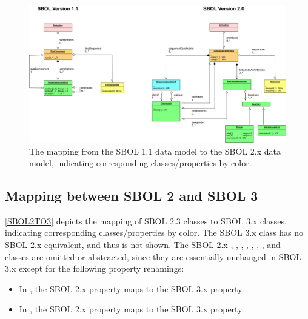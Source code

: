 \begin{figure}[htp]
\begin{center}
  \includegraphics[width=\textwidth]{images/sbol_v1_to_v2}
\end{center}
\caption{\label{SBOL1TO2}The mapping from the SBOL 1.1 data model to the SBOL 2.x  data model, indicating corresponding classes/properties by color.}
\end{figure}



\subsection{Mapping between SBOL 2 and SBOL 3}

\ref{SBOL2TO3} depicts the mapping of SBOL 2.3 classes to SBOL 3.x classes, indicating corresponding classes/properties by color.   
The SBOL 3.x  class has no SBOL 2.x equivalent, and thus is not shown.
The SBOL 2.x , , , , , , , and \\  classes are omitted or abstracted, since they are essentially unchanged in SBOL 3.x except for the following property renamings:
\begin{itemize}
\item In , the SBOL 2.x  property maps to the SBOL 3.x  property.
\item In , the SBOL 2.x  property maps to the SBOL 3.x  property.
\end{itemize}

